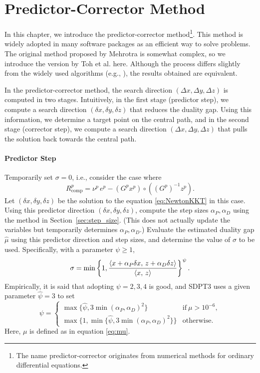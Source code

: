 \section{Predictor-Corrector Method}
In this chapter, we introduce the predictor-corrector method\footnote{The name predictor-corrector originates from numerical methods for ordinary differential equations.}.
This method is widely adopted in many software packages as an efficient way to solve problems.
The original method proposed by Mehrotra \cite{Mehrotra1992} is somewhat complex, so we introduce the version by Toh et al. \cite{toh1999} here.
Although the process differs slightly from the widely used algorithms (e.g., \cite{Wright1997}), the results obtained are equivalent.

In the predictor-corrector method, the search direction $(\Delta x, \Delta y, \Delta z)$ is computed in two stages.
Intuitively, in the first stage (predictor step), we compute a search direction $(\delta x, \delta y, \delta z)$ that reduces the duality gap.
Using this information, we determine a target point on the central path, and in the second stage (corrector step), we compute a search direction $(\Delta x, \Delta y, \Delta z)$ that pulls the solution back towards the central path.

\paragraph{Predictor Step}
Temporarily set $\sigma=0$, i.e., consider the case where
\[R^p_{\mathrm{comp}}=\nu^p \, e^p - (G^p x^p) \circ ((G^p)^{-1} z^p).\]
Let $(\delta x, \delta y, \delta z)$ be the solution to the equation \eqref{eq:NewtonKKT} in this case.
Using this predictor direction $(\delta x, \delta y, \delta z)$, compute the step sizes $\alpha_P, \alpha_D$ using the method in Section~\ref{sec:step_size}.
(This does not actually update the variables but temporarily determines $\alpha_P, \alpha_D$.)
Evaluate the estimated duality gap $\hat{\mu}$ using this predictor direction and step sizes, and determine the value of $\sigma$ to be used.
Specifically, with a parameter $\psi \ge 1$,
\[
   \sigma=\min\left\{1, \frac{\left\langle x + \alpha_P \delta x, \, z + \alpha_D \delta z \right\rangle}{\left\langle x, \, z \right\rangle}\right\}^\psi.
\]
Empirically, it is said that adopting $\psi=2,3,4$ is good, and SDPT3 uses a given parameter $\hat{\psi}=3$ to set
\[
\psi = \begin{cases}
    \max\{\hat{\psi}, 3 \min(\alpha_P, \alpha_D)^2\} & \text{if} ~ \mu > 10^{-6}, \\
    \max\{1, \min\{\hat{\psi}, 3 \min(\alpha_P, \alpha_D)^2\}\} & \text{otherwise}.
\end{cases}
\]
Here, $\mu$ is defined as in equation \eqref{eq:mu}.

